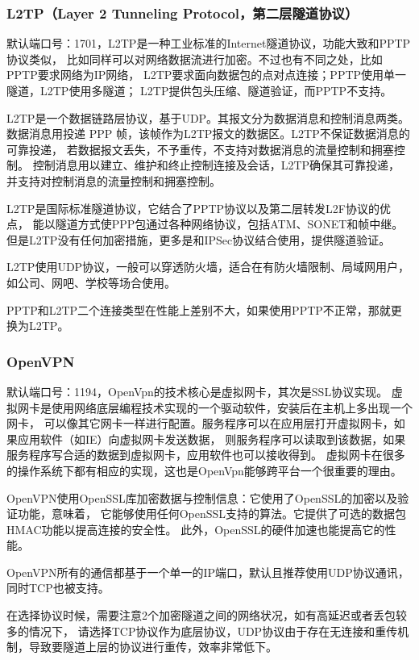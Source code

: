 \documentclass{book}
\begin{document}
\subsubsection{L2TP（Layer 2 Tunneling Protocol，第二层隧道协议）}

默认端口号：1701，L2TP是一种工业标准的Internet隧道协议，功能大致和PPTP协议类似，
比如同样可以对网络数据流进行加密。不过也有不同之处，比如PPTP要求网络为IP网络，
L2TP要求面向数据包的点对点连接；PPTP使用单一隧道，L2TP使用多隧道；
L2TP提供包头压缩、隧道验证，而PPTP不支持。

L2TP是一个数据链路层协议，基于UDP。其报文分为数据消息和控制消息两类。
数据消息用投递 PPP 帧，该帧作为L2TP报文的数据区。L2TP不保证数据消息的可靠投递，
若数据报文丢失，不予重传，不支持对数据消息的流量控制和拥塞控制。
控制消息用以建立、维护和终止控制连接及会话，L2TP确保其可靠投递，
并支持对控制消息的流量控制和拥塞控制。

L2TP是国际标准隧道协议，它结合了PPTP协议以及第二层转发L2F协议的优点，
能以隧道方式使PPP包通过各种网络协议，包括ATM、SONET和帧中继。
但是L2TP没有任何加密措施，更多是和IPSec协议结合使用，提供隧道验证。

L2TP使用UDP协议，一般可以穿透防火墙，适合在有防火墙限制、局域网用户，如公司、网吧、学校等场合使用。

PPTP和L2TP二个连接类型在性能上差别不大，如果使用PPTP不正常，那就更换为L2TP。

\subsubsection{OpenVPN}

默认端口号：1194，OpenVpn的技术核心是虚拟网卡，其次是SSL协议实现。
虚拟网卡是使用网络底层编程技术实现的一个驱动软件，安装后在主机上多出现一个网卡，
可以像其它网卡一样进行配置。服务程序可以在应用层打开虚拟网卡，如果应用软件（如IE）向虚拟网卡发送数据，
则服务程序可以读取到该数据，如果服务程序写合适的数据到虚拟网卡，应用软件也可以接收得到。
虚拟网卡在很多的操作系统下都有相应的实现，这也是OpenVpn能够跨平台一个很重要的理由。

OpenVPN使用OpenSSL库加密数据与控制信息：它使用了OpenSSL的加密以及验证功能，意味着，
它能够使用任何OpenSSL支持的算法。它提供了可选的数据包HMAC功能以提高连接的安全性。
此外，OpenSSL的硬件加速也能提高它的性能。

OpenVPN所有的通信都基于一个单一的IP端口，默认且推荐使用UDP协议通讯，同时TCP也被支持。

在选择协议时候，需要注意2个加密隧道之间的网络状况，如有高延迟或者丢包较多的情况下，
请选择TCP协议作为底层协议，UDP协议由于存在无连接和重传机制，导致要隧道上层的协议进行重传，效率非常低下。
\end{document}
